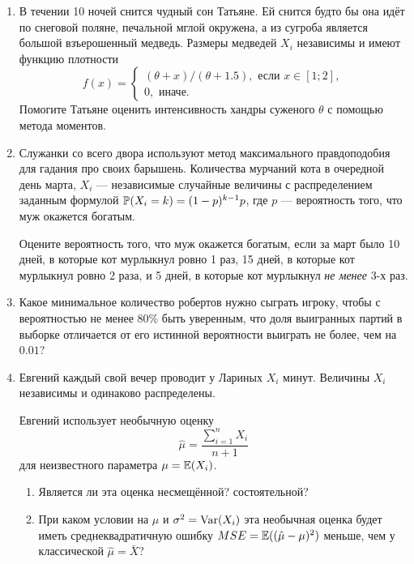   
  \begin{enumerate}
  
  
  \item В течении 10 ночей снится чудный сон Татьяне. Ей снится будто бы она идёт по снеговой поляне, 
  печальной мглой окружена, а из сугроба является большой взъерошенный медведь. 
  Размеры медведей $X_i$ независимы и имеют функцию плотности 
  \[
  f(x) = \begin{cases}    
  (\theta + x)/(\theta + 1.5), \text{ если } x \in [1;2], \\
  0,  \text{ иначе}.
  \end{cases}
  \]
  Помогите Татьяне оценить интенсивность хандры суженого $\theta$ с помощью метода моментов. 
  
  \item Служанки со всего двора используют метод максимального правдоподобия для 
  гадания про своих барышень. 
  Количества мурчаний кота в очередной день марта, $X_i$ —
  независимые случайные величины с распределением заданным формулой $\P(X_i = k) = (1-p)^{k-1}p$,
  где $p$ — вероятность того, что муж окажется богатым. 
  
  Оцените вероятность того, что муж окажется богатым, если за март было 10 дней, 
  в которые кот мурлыкнул ровно 1 раз, 15 дней, в которые кот мурлыкнул ровно 2 раза,
  и 5 дней, в которые кот мурлыкнул \textit{не менее} 3-х раз. 
  
  \item Какое минимальное количество робертов нужно сыграть игроку, чтобы 
  с вероятностью не менее 80\% быть уверенным, что доля выигранных партий в выборке 
  отличается от его истинной вероятности выиграть не более, чем на $0.01$?
  
  \item Евгений каждый свой вечер проводит у Лариных $X_i$ минут. 
  Величины $X_i$ независимы и одинаково распределены. 
  
  Евгений использует необычную оценку 
  \[
  \hat\mu = \frac{\sum_{i=1}^n X_i}{n+1}
  \]
  для неизвестного параметра $\mu = \E(X_i)$. 
  
  \begin{enumerate}
      \item Является ли эта оценка несмещённой? состоятельной?
      \item При каком условии на $\mu$ и $\sigma^2 = \Var(X_i)$ эта
      необычная оценка будет иметь среднеквадратичную ошибку $MSE = \E((\hat \mu - \mu)^2)$ меньше, чем у классической $\hat\mu=\bar X$?
  \end{enumerate}
  

\end{enumerate}
